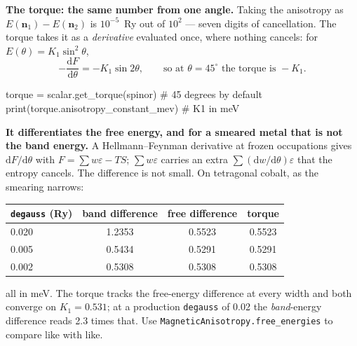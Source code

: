 \documentclass[11pt,a4paper]{article}
\newcommand{\code}[1]{\texttt{\small #1}}
\begin{document}
\textbf{The torque: the same number from one angle.} Taking the anisotropy as
$E(\mathbf n_1)-E(\mathbf n_2)$ is $10^{-5}$~Ry out of $10^{2}$ --- seven digits
of cancellation. The torque takes it as a \emph{derivative} evaluated once,
where nothing cancels: for $E(\theta)=K_1\sin^2\theta$,
\begin{equation*}
  -\frac{\mathrm dF}{\mathrm d\theta} = -K_1\sin 2\theta,
  \qquad\text{so at }\theta=45^\circ\text{ the torque is }-K_1 .
\end{equation*}

\begin{pycode}
torque = scalar.get_torque(spinor)              # 45 degrees by default
print(torque.anisotropy_constant_mev)           # K1 in meV
\end{pycode}

\textbf{It differentiates the free energy, and for a smeared metal that is not
the band energy.} A Hellmann--Feynman derivative at frozen occupations gives
$\mathrm dF/\mathrm d\theta$ with $F=\sum w\varepsilon-TS$; $\sum w\varepsilon$
carries an extra $\sum(\mathrm dw/\mathrm d\theta)\varepsilon$ that the entropy
cancels. The difference is not small. On tetragonal cobalt, as the smearing
narrows:

\begin{center}
\begin{tabular}{lccc}
\code{degauss} (Ry) & band difference & free difference & torque \\
\hline
0.020 & 1.2353 & 0.5523 & 0.5523 \\
0.005 & 0.5434 & 0.5291 & 0.5291 \\
0.002 & 0.5308 & 0.5308 & 0.5308 \\
\end{tabular}
\end{center}

\noindent all in meV. The torque tracks the free-energy difference at every
width and both converge on $K_1=0.531$; at a production \code{degauss} of 0.02
the \emph{band}-energy difference reads 2.3 times that. Use
\code{MagneticAnisotropy.free\_energies} to compare like with like.
\end{document}
